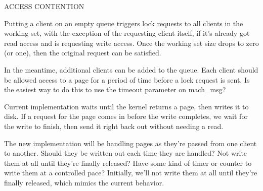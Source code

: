\documentclass{article}
\begin{document}
\begin{comment}
We need a paging out flag, and a bit to indicate if the granted access
is read-only or read-write.  Assume that the {\tt error} field is
always {\tt KERN_SUCCESS}.  The ACCESSLIST requires one bit per client
to indicate if access is granted.  The WAITLIST is sorted (client
requests are processed FIFO) and requires four bits per slot -- three
to identify the client (all ones indicates an empty slot), and one to
indicate if the request is for read or write access.  Thus, we need
seven bits for the ACCESSLIST, two more flag bits (paging out and
read/write access), one bit to indicate that this isn't a pointer,
leaving room for five WAITLIST slots.

Once we hit our seventh client, or some oddball condition (like an
error return other than the expected KERN_SUCCESS, or a sixth client
on the WAITLIST), we shift to a pointer that points to a more
complicated, dynamically allocated structure.

Likewise, a 64-bit pointer (wishful thinking at the moment, since Hurd
is currently a 32-bit system) would allow fifteen clients, with an
eleven client WAITLIST.  Both the 32-bit and the 64-bit scheme have
two bits left over, perhaps they could be used to allow EIO, ENOSPC,
and EDQUOT, in addition to KERN_SUCCESS, since these seem to be the
most likely error codes.

\end{comment}

ACCESS CONTENTION

Putting a client on an empty queue triggers lock requests to all
clients in the working set, with the exception of the requesting
client itself, if it's already got read access and is requesting write
access.  Once the working set size drops to zero (or one), then the
original request can be satisfied.

In the meantime, additional clients can be added to the queue.  Each
client should be allowed access to a page for a period of time before
a lock request is sent.  Is the easiest way to do this to use the
timeout parameter on mach_msg?

Current implementation waits until the kernel returns a page, then
writes it to disk.  If a request for the page comes in before the
write completes, we wait for the write to finish, then send it right
back out without needing a read.

The new implementation will be handling pages as they're passed from
one client to another.  Should they be written out each time they are
handled?  Not write them at all until they're finally released?  Have
some kind of timer or counter to write them at a controlled pace?
Initially, we'll not write them at all until they're finally released,
which mimics the current behavior.
\end{document}
